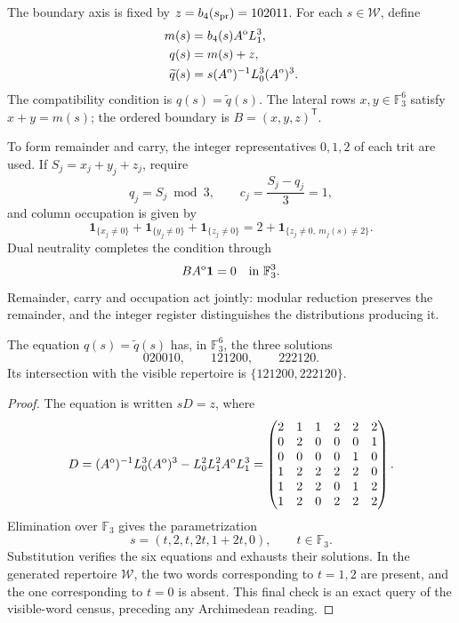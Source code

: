 The boundary axis is fixed by $z=b_4(s_{\rm pr})=102011$. For each $s\in\mathcal W$, define
\begin{align}
m(s)&=b_4(s)A^{\rm o}L_1^3,\\
q(s)&=m(s)+z,\\
\widetilde q(s)&=s(A^{\rm o})^{-1}L_0^3(A^{\rm o})^3.
\label{r36c:eq:compat-datos}
\end{align}
The compatibility condition is $q(s)=\widetilde q(s)$. The lateral rows $x,y\in\mathbb F_3^6$ satisfy $x+y=m(s)$; the ordered boundary is $B=(x,y,z)^{\mathsf T}$.

To form remainder and carry, the integer representatives $0,1,2$ of each trit are used. If $S_j=x_j+y_j+z_j$, require
\[
q_j=S_j\bmod3,\qquad c_j=\frac{S_j-q_j}{3}=1,
\]
and column occupation is given by
\begin{equation}
\mathbf1_{\{x_j\ne0\}}+\mathbf1_{\{y_j\ne0\}}+\mathbf1_{\{z_j\ne0\}}
=2+\mathbf1_{\{z_j\ne0,\ m_j(s)\ne2\}}.
\label{r36c:eq:ocupacion}
\end{equation}
Dual neutrality completes the condition through
\begin{equation}
BA^{\rm o}\mathbf1=0\quad\hbox{in }\mathbb F_3^3.
\label{r36c:eq:neutralidad}
\end{equation}
Remainder, carry and occupation act jointly: modular reduction preserves the remainder, and the integer register distinguishes the distributions producing it.

\begin{lemma}
\label{r36c:lem:compatibilidad} The equation $q(s)=\widetilde q(s)$ has, in $\mathbb F_3^6$, the three solutions
\[
020010,\qquad121200,\qquad222120.
\]
Its intersection with the visible repertoire is $\{121200,222120\}$.
\end{lemma}
\begin{proof}
The equation is written $sD=z$, where
\[
D=(A^{\rm o})^{-1}L_0^3(A^{\rm o})^3
   -L_0^2L_1^2A^{\rm o}L_1^3
 =\begin{pmatrix}
2&1&1&2&2&2\\0&2&0&0&0&1\\0&0&0&0&1&0\\
1&2&2&2&2&0\\1&2&2&0&1&2\\1&2&0&2&2&2
\end{pmatrix}.
\]
Elimination over $\mathbb F_3$ gives the parametrization
\[
s=(t,2,t,2t,1+2t,0),\qquad t\in\mathbb F_3.
\]
Substitution verifies the six equations and exhausts their solutions. In the generated repertoire $\mathcal W$, the two words corresponding to $t=1,2$ are present, and the one corresponding to $t=0$ is absent. This final check is an exact query of the visible-word census, preceding any Archimedean reading.
\end{proof}

